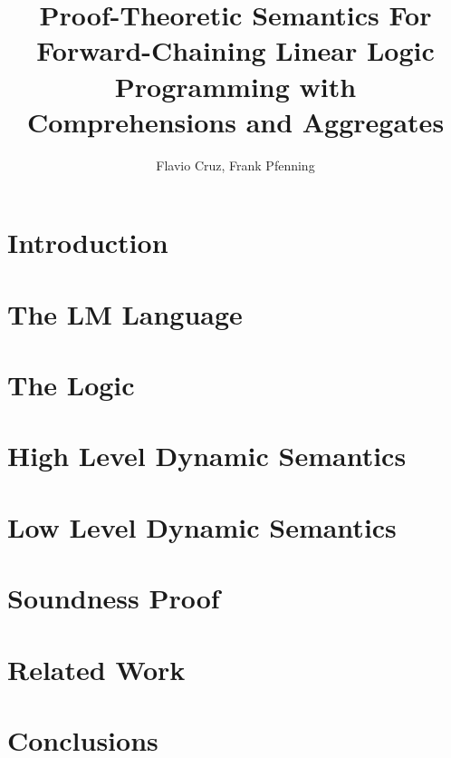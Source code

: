 \documentclass{llncs}
\begin{document}
\newcommand{\cmu}{\ensuremath{^\dag}}
\newcommand{\fcup}{\ensuremath{^\ddag}}

\title{Proof-Theoretic Semantics For Forward-Chaining Linear Logic Programming with Comprehensions and Aggregates}
\author{Flavio Cruz, Frank Pfenning}



\maketitle
\begin{abstract}

\end{abstract}
\pagestyle{headings}  %

\section{Introduction}


\section{The LM Language}


\section{The \fragment Logic}


\section{High Level Dynamic Semantics}


\section{Low Level Dynamic Semantics}


\section{Soundness Proof}
%

\section{Related Work}


\section{Conclusions}





\appendix
\section{\fragment}

\end{document}
